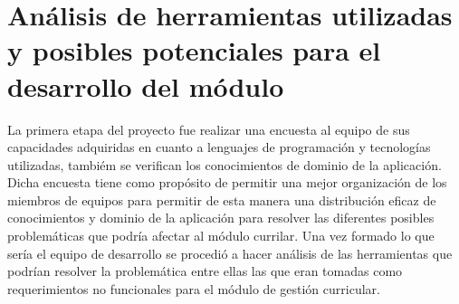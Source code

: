 \section{Análisis de herramientas utilizadas y posibles potenciales para el desarrollo del módulo}
La primera etapa del proyecto fue realizar una encuesta al equipo de sus capacidades adquiridas en cuanto a lenguajes de programación y tecnologías utilizadas, tambiém se verifican los conocimientos de dominio de la aplicación.
Dicha encuesta tiene como propósito de permitir una mejor organización de los miembros de equipos para permitir de esta manera una distribución eficaz de conocimientos y dominio de la aplicación para resolver las diferentes posibles problemáticas que podría afectar al módulo currilar.
Una vez formado lo que sería el equipo de desarrollo se procedió a hacer análisis de las herramientas que podrían resolver la problemática entre ellas las que eran tomadas como requerimientos no funcionales para el módulo de gestión curricular.